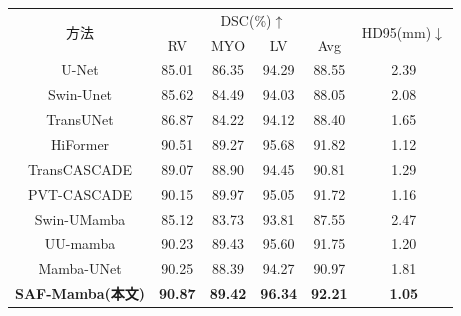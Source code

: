 \documentclass[12pt, a4paper, twoside]{article}
\begin{document}
\begin{table}[htbp]
    \centering
    \label{tab:acdc_full_v2}
    \begin{tabular}{cccccc}
        \toprule
        \multirow{2}{*}{方法} & \multicolumn{4}{c}{DSC(\%)$\uparrow$} & \multirow{2}{*}{HD95(mm)$\downarrow$} \\
        & RV & MYO & LV & Avg & \\
        \midrule
        U-Net & 85.01 & 86.35 & 94.29 & 88.55 & 2.39 \\
        Swin-Unet & 85.62 & 84.49 & 94.03 & 88.05 & 2.08 \\
        TransUNet & 86.87 & 84.22 & 94.12 & 88.40 & 1.65 \\
        HiFormer & 90.51 & 89.27 & 95.68 & 91.82 & 1.12 \\
        TransCASCADE & 89.07 & 88.90 & 94.45 & 90.81 & 1.29 \\
        PVT-CASCADE & 90.15 & 89.97 & 95.05 & 91.72 & 1.16 \\
        Swin-UMamba & 85.12 & 83.73 & 93.81 & 87.55 & 2.47 \\
        UU-mamba & 90.23 & 89.43 & 95.60 & 91.75 & 1.20 \\
        Mamba-UNet & 90.25 & 88.39 & 94.27 & 90.97 & 1.81 \\
        \midrule
        \textbf{SAF-Mamba(本文)} & \textbf{90.87} & \textbf{89.42} & \textbf{96.34} & \textbf{92.21} & \textbf{1.05} \\
        \bottomrule
    \end{tabular}
\end{table}
\end{document}
